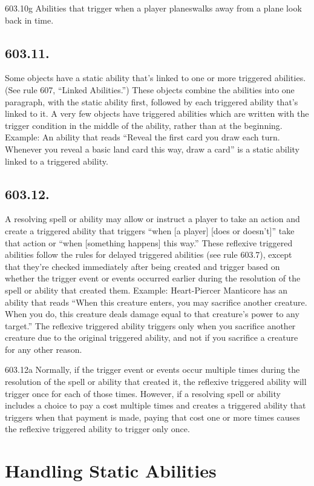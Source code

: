 603.10g Abilities that trigger when a player planeswalks away from a plane look back in time.

\subsection*{603.11.}
Some objects have a static ability that’s linked to one or more triggered abilities. (See rule 607, “Linked Abilities.”) These objects combine the abilities into one paragraph, with the static ability first, followed by each triggered ability that’s linked to it. A very few objects have triggered abilities which are written with the trigger condition in the middle of the ability, rather than at the beginning.
Example: An ability that reads “Reveal the first card you draw each turn. Whenever you reveal a basic land card this way, draw a card” is a static ability linked to a triggered ability.

\subsection*{603.12.}
A resolving spell or ability may allow or instruct a player to take an action and create a triggered ability that triggers “when [a player] [does or doesn’t]” take that action or “when [something happens] this way.” These reflexive triggered abilities follow the rules for delayed triggered abilities (see rule 603.7), except that they’re checked immediately after being created and trigger based on whether the trigger event or events occurred earlier during the resolution of the spell or ability that created them.
Example: Heart-Piercer Manticore has an ability that reads “When this creature enters, you may sacrifice another creature. When you do, this creature deals damage equal to that creature’s power to any target.” The reflexive triggered ability triggers only when you sacrifice another creature due to the original triggered ability, and not if you sacrifice a creature for any other reason.

603.12a Normally, if the trigger event or events occur multiple times during the resolution of the spell or ability that created it, the reflexive triggered ability will trigger once for each of those times. However, if a resolving spell or ability includes a choice to pay a cost multiple times and creates a triggered ability that triggers when that payment is made, paying that cost one or more times causes the reflexive triggered ability to trigger only once.

\section{Handling Static Abilities}
